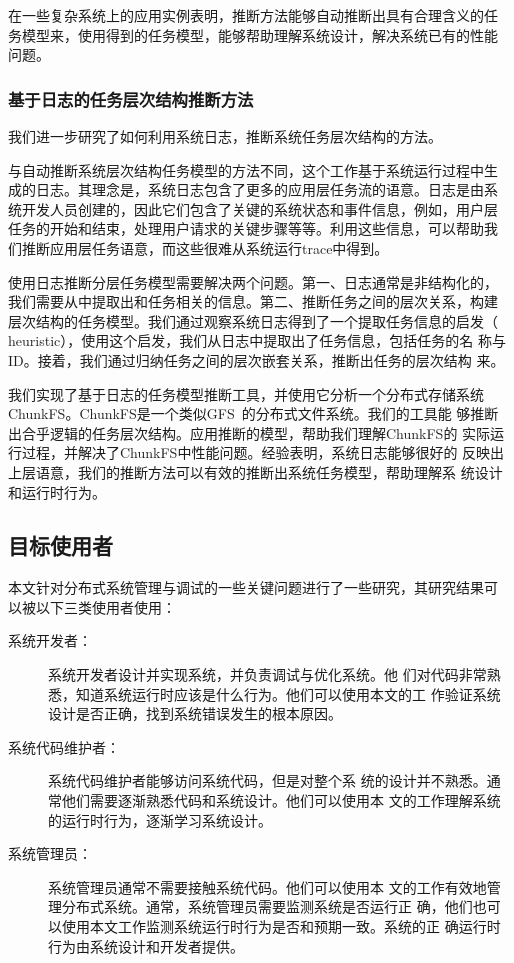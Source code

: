 在一些复杂系统上的应用实例表明，推断方法能够自动推断出具有合理含义的任
务模型来，使用得到的任务模型，能够帮助理解系统设计，解决系统已有的性能
问题。

\subsubsection*{基于日志的任务层次结构推断方法}


我们进一步研究了如何利用系统日志，推断系统任务层次结构的方法。

与自动推断系统层次结构任务模型的方法不同，这个工作基于系统运行过程中生
成的日志。其理念是，系统日志包含了更多的应用层任务流的语意。日志是由系
统开发人员创建的，因此它们包含了关键的系统状态和事件信息，例如，用户层
任务的开始和结束，处理用户请求的关键步骤等等。利用这些信息，可以帮助我
们推断应用层任务语意，而这些很难从系统运行trace中得到。

使用日志推断分层任务模型需要解决两个问题。第一、日志通常是非结构化的，
我们需要从中提取出和任务相关的信息。第二、推断任务之间的层次关系，构建
层次结构的任务模型。我们通过观察系统日志得到了一个提取任务信息的启发（
heuristic），使用这个启发，我们从日志中提取出了任务信息，包括任务的名
称与ID。接着，我们通过归纳任务之间的层次嵌套关系，推断出任务的层次结构
来。

我们实现了基于日志的任务模型推断工具，并使用它分析一个分布式存储系统
ChunkFS。ChunkFS是一个类似GFS~\cite{gfs}的分布式文件系统。我们的工具能
够推断出合乎逻辑的任务层次结构。应用推断的模型，帮助我们理解ChunkFS的
实际运行过程，并解决了ChunkFS中性能问题。经验表明，系统日志能够很好的
反映出上层语意，我们的推断方法可以有效的推断出系统任务模型，帮助理解系
统设计和运行时行为。

\subsection{目标使用者}

本文针对分布式系统管理与调试的一些关键问题进行了一些研究，其研究结果可
以被以下三类使用者使用：

\begin{description}

  \item[系统开发者：] 系统开发者设计并实现系统，并负责调试与优化系统。他
  们对代码非常熟悉，知道系统运行时应该是什么行为。他们可以使用本文的工
  作验证系统设计是否正确，找到系统错误发生的根本原因。

  \item[系统代码维护者：] 系统代码维护者能够访问系统代码，但是对整个系
  统的设计并不熟悉。通常他们需要逐渐熟悉代码和系统设计。他们可以使用本
  文的工作理解系统的运行时行为，逐渐学习系统设计。

  \item[系统管理员：] 系统管理员通常不需要接触系统代码。他们可以使用本
  文的工作有效地管理分布式系统。通常，系统管理员需要监测系统是否运行正
  确，他们也可以使用本文工作监测系统运行时行为是否和预期一致。系统的正
  确运行时行为由系统设计和开发者提供。

\end{description}

